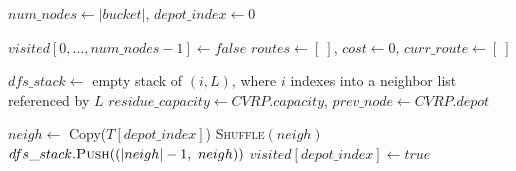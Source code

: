 \begin{algorithm}[htbp]
\caption{\textsc{Get\_Routes\_From\_Random\_DFS}}
\label{alg:get-routes-from-random-dfs}
\SetAlgoLined
\SetEndCharOfAlgoLine{}


$num\_nodes \gets |bucket|$, $depot\_index \gets 0$\;                                                                       \label{alg:get-routes-from-random-dfs:line1}

$visited[0, \dots ,num\_nodes - 1] \gets false$\;                                                                           \label{alg:get-routes-from-random-dfs:line2}
$routes \gets [\ ]$,  $cost \gets 0$, $curr\_route \gets [\ ]$\;                                                            \label{alg:get-routes-from-random-dfs:line3}

$dfs\_stack \gets$ empty stack of $(i, L)$, where $i$ indexes into a neighbor list referenced by $L$\;                      \label{alg:get-routes-from-random-dfs:line4}
$residue\_capacity \gets CVRP.capacity$, $prev\_node \gets CVRP.depot$\;                                                    \label{alg:get-routes-from-random-dfs:line5}

$neigh \gets$ Copy($T[depot\_index]$)\;                                                                                     \label{alg:get-routes-from-random-dfs:line6}
\textsc{Shuffle}$(neigh)$\;                                                                                                 \label{alg:get-routes-from-random-dfs:line7}
$dfs\_stack.\textsc{Push}((|neigh|-1,\ neigh))$\;                                                                           \label{alg:get-routes-from-random-dfs:line8}
$visited[depot\_index] \gets true$\;                                                                                        \label{alg:get-routes-from-random-dfs:line9}

\end{algorithm}
